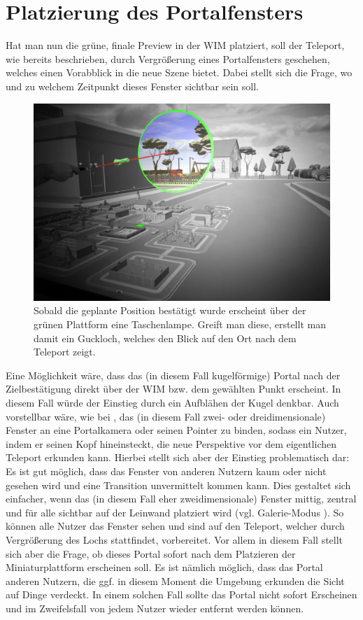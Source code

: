 \section{Platzierung des Portalfensters}
Hat man nun die grüne, finale Preview in der WIM platziert, soll der Teleport, wie bereits beschrieben, durch Vergrößerung eines Portalfensters geschehen, welches einen Vorabblick in die neue Szene bietet. Dabei stellt sich die Frage, wo und zu welchem Zeitpunkt dieses Fenster sichtbar sein soll.

\begin{figure}[h!]
  \centering
  \includegraphics[width=\textwidth]{images/peephole.jpg}
  \caption{Sobald die geplante Position bestätigt wurde erscheint über der grünen Plattform eine Taschenlampe. Greift man diese, erstellt man damit ein Guckloch, welches den Blick auf den Ort nach dem Teleport zeigt.}
  \label{fig:todo}
\end{figure}

Eine Möglichkeit wäre, dass das (in diesem Fall kugelförmige) Portal nach der Zielbestätigung direkt über der WIM bzw. dem gewählten Punkt erscheint. In diesem Fall würde der Einstieg durch ein Aufblähen der Kugel denkbar.
Auch vorstellbar wäre, wie bei \cite{Kunert2014Photoportals}, das (in diesem Fall zwei- oder dreidimensionale) Fenster an eine Portalkamera oder seinen Pointer zu binden, sodass ein Nutzer, indem er seinen Kopf hineinsteckt, die neue Perspektive vor dem eigentlichen Teleport erkunden kann. Hierbei stellt sich aber der Einstieg problematisch dar: Es ist gut möglich, dass das Fenster von anderen Nutzern kaum oder nicht gesehen wird und eine Transition unvermittelt kommen kann.
Dies gestaltet sich einfacher, wenn das (in diesem Fall eher zweidimensionale) Fenster mittig, zentral und für alle sichtbar auf der Leinwand platziert wird (vgl. Galerie-Modus \cite{Kunert2014Photoportals}). So können  alle Nutzer das Fenster sehen und sind auf den Teleport, welcher durch Vergrößerung des Lochs stattfindet, vorbereitet.
Vor allem in diesem Fall stellt sich aber die Frage, ob dieses Portal sofort nach dem Platzieren der Miniaturplattform erscheinen soll. Es ist nämlich möglich, dass das Portal anderen Nutzern, die ggf. in diesem Moment die Umgebung erkunden die Sicht auf Dinge verdeckt. In einem solchen Fall sollte das Portal nicht sofort Erscheinen und im Zweifelsfall von jedem Nutzer wieder entfernt werden können.

